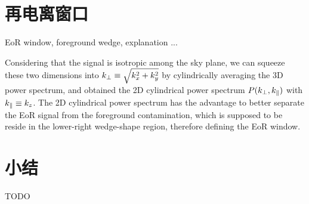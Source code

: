\section{再电离窗口}
\label{sec:eor-window}

EoR window, foreground wedge, explanation ...

Considering that the signal is isotropic among the sky plane, we can
squeeze these two dimensions into $k_{\bot} \equiv \sqrt{k_x^2 + k_y^2}$ by
cylindrically averaging the 3D power spectrum, and obtained the 2D
cylindrical power spectrum $P(k_{\bot}, k_{\parallel})$ with $k_{\parallel} \equiv k_z$.
The 2D cylindrical power spectrum has the advantage to better separate
the EoR signal from the foreground contamination, which is supposed to
be reside in the lower-right wedge-shape region, therefore defining the
EoR window.


\section{小结}

TODO


